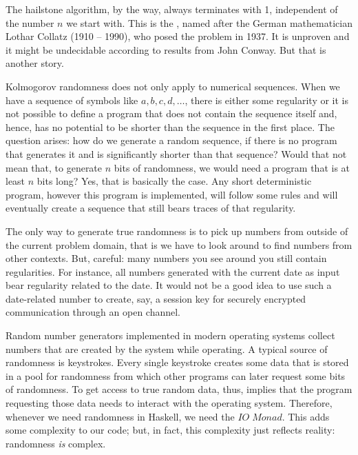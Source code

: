 \documentclass{scrreprt}
\newcommand{\Conid}[1]{\mathit{#1}}
\begin{document}
The hailstone algorithm, by the way,
always terminates with 1, independent of the number $n$
we start with.
This is the ,
named after the German mathematician 
Lothar Collatz (1910 -- 1990),
who posed the problem in 1937.
It is unproven and it might be undecidable
according to results from John Conway.
But that is another story.

Kolmogorov randomness 
does not only apply to numerical sequences.
When we have a sequence of symbols like
$a,b,c,d,\dots$, there is either some regularity
or it is not possible to define a program
that does not contain the sequence itself and,
hence, has no potential to be shorter
than the sequence in the first place.
The question arises:
how do we generate a random sequence,
if there is no program that generates it
and is significantly shorter than that sequence?
Would that not mean that,
to generate $n$ bits of randomness,
we would need a program that is at least $n$ bits long?
Yes, that is basically the case.
Any short deterministic program,
however this program is implemented,
will follow some rules and will eventually
create a sequence that still bears traces
of that regularity.

The only way to generate true randomness
is to pick up numbers from outside of
the current problem domain, that is
we have to look around to find numbers
from other contexts. 
But, careful: many numbers you see around you still
contain regularities. For instance,
all numbers generated with the current date
as input bear regularity related to the date.
It would not be a good idea to use such a date-related
number to create, say, a session key for
securely encrypted communication through an open channel.

Random number generators implemented in modern
operating systems collect numbers
that are created by the system while operating.
A typical source of randomness is keystrokes.
Every single keystroke creates some data
that is stored in a pool 
for randomness from which other programs
can later request some bits of randomness.
To get access to true random data, thus, implies
that the program requesting those data
needs to interact with the operating system.
Therefore, whenever we need randomness
in Haskell, we need the \ensuremath{\Conid{IO}\;\Conid{Monad}}. 
This adds some complexity to our code;
but, in fact, this complexity just reflects
reality: randomness \emph{is} complex.
\end{document}
